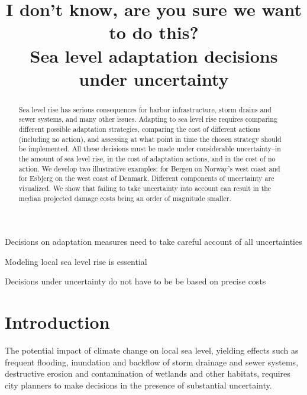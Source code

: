 \documentclass[draft,linenumbers]{agujournal}
\begin{document}
\title{I don't know, are you sure we want to do this?\\
Sea level adaptation decisions under uncertainty}




\begin{keypoints}
\item Decisions on adaptation measures need to take careful account of all uncertainties
\item Modeling local sea level rise is essential
\item Decisions under uncertainty do not have to be be based on precise costs
\end{keypoints}


\begin{abstract}
Sea level rise has serious consequences for harbor infrastructure, storm drains and sewer systems, and many other issues. Adapting to sea level rise requires comparing different possible adaptation strategies, comparing the cost of different actions (including no action), and assessing at what point in time the chosen strategy should be implemented. All these decisions must be made under considerable uncertainty--in the amount of sea level rise, in the cost of adaptation actions, and in the cost of no action. We develop two illustrative examples: for Bergen on Norway's west coast and for Esbjerg on the west coast of Denmark. Different components of uncertainty are visualized. We show that failing to take uncertainty into account can result in the median projected damage costs being an order of magnitude smaller.
\end{abstract}




\section{Introduction}\label{sec:intro}
The potential impact of climate change on local sea level, yielding effects such as frequent flooding, inundation and backflow of storm drainage and sewer systems, destructive erosion and contamination of wetlands and other habitats, requires city planners to make decisions in the presence of substantial uncertainty.
\end{document}
